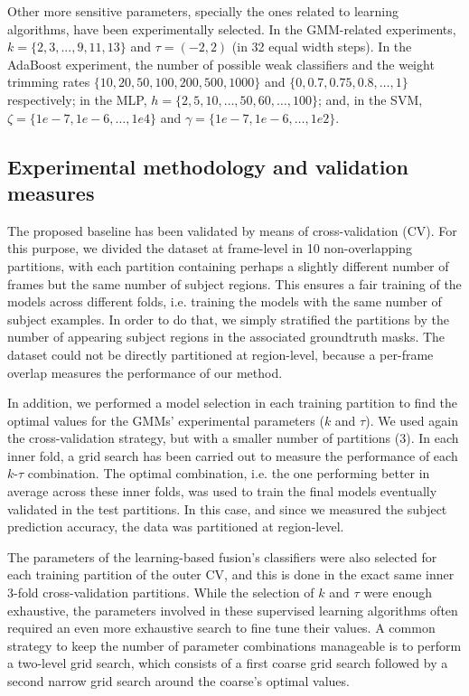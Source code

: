\documentclass[10pt,twocolumn,letterpaper]{article}
\begin{document}
Other more sensitive parameters, specially the ones related to learning algorithms, have been experimentally selected. In the GMM-related experiments, $k = \{2,3, ..., 9, 11, 13\}$ and $\tau = (-2,2)$ (in 32 equal width steps). In the AdaBoost experiment, the number of possible weak classifiers and the weight trimming rates  $\{10, 20, 50, 100, 200, 500, 1000\}$ and $\{0, 0.7, 0.75, 0.8, \ldots, 1\}$ respectively; in the MLP, $h = \{2, 5, 10, \ldots, 50, 60, \ldots, 100\}$; and, in the SVM, $\zeta = \{1e-7, 1e-6, \ldots, 1e4\}$ and $\gamma = \{1e-7, 1e-6, \ldots, 1e2\}$.


\subsection{Experimental methodology and validation measures}
\label{ssec:validation}

The proposed baseline has been validated by means of cross-validation (CV). For this purpose, we divided the dataset at frame-level in 10 non-overlapping partitions, with each partition containing perhaps a slightly different number of frames but the same number of subject regions. This ensures a fair training of the models across different folds, i.e. training the models with the same number of subject examples. In order to do that, we simply stratified the partitions by the number of appearing subject regions in the associated groundtruth masks. The dataset could not be directly partitioned at region-level, because a per-frame overlap measures the performance of our method.

In addition, we performed a model selection in each training partition to find the optimal values for the GMMs' experimental parameters ($k$ and $\tau$). We used again the cross-validation strategy, but with a smaller number of partitions (3). In each inner fold, a grid search has been carried out to measure the performance of each $k$-$\tau$ combination. The optimal combination, i.e. the one performing better in average across these inner folds, was used to train the final models eventually validated in the test partitions. In this case, and since we measured the subject prediction accuracy, the data was partitioned at region-level.

The parameters of the learning-based fusion's classifiers were also selected for each training partition of the outer CV, and this is done in the exact same inner 3-fold cross-validation partitions. While the selection of $k$ and $\tau$ were  enough exhaustive, the parameters involved in these supervised learning algorithms often required an even more exhaustive search to fine tune their values. A common strategy to keep the number of parameter combinations manageable is to perform a two-level grid search, which consists of a first coarse grid search followed by a second narrow grid search around the coarse's optimal values.
\end{document}
